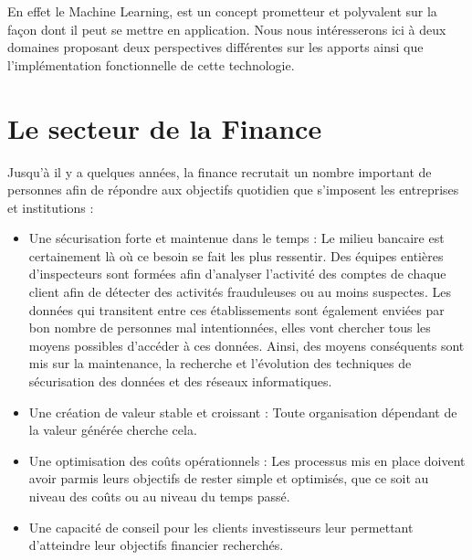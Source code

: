     En effet le Machine Learning, est un concept prometteur
    et polyvalent sur la façon dont il peut se mettre en application.
    Nous nous intéresserons ici à deux domaines proposant deux perspectives différentes
    sur les apports ainsi que l'implémentation fonctionnelle de cette technologie.

    \section{Le secteur de la Finance}
        Jusqu'à il y a quelques années, la finance recrutait un nombre
        important de personnes afin de répondre aux objectifs quotidien
        que s'imposent les entreprises et institutions :\newline

        \begin{itemize}

            \item Une sécurisation forte et maintenue dans le temps : \newline
            Le milieu bancaire est certainement là où ce besoin se fait les plus ressentir.
            Des équipes entières d'inspecteurs sont formées afin d'analyser
            l'activité des comptes de chaque client
            afin de détecter des activités frauduleuses ou au moins suspectes. \newline
            Les données qui transitent entre ces établissements sont également
            enviées par bon nombre de personnes mal intentionnées,
            elles vont chercher tous les moyens possibles d'accéder à ces données. Ainsi,
            des moyens conséquents sont mis sur la maintenance, la recherche et l'évolution
            des techniques de sécurisation des données et des réseaux informatiques. \newline

            \item Une création de valeur stable et croissant : \newline
            Toute organisation dépendant de la valeur générée cherche cela. \newline

            \item Une optimisation des coûts opérationnels : \newline
            Les processus mis en place doivent avoir parmis leurs objectifs de
            rester simple et optimisés, que ce soit au niveau des coûts
            ou au niveau du temps passé. \newline

            \item Une capacité de conseil pour les clients investisseurs leur permettant 
            d'atteindre leur objectifs financier recherchés. \newline
        \end{itemize}

